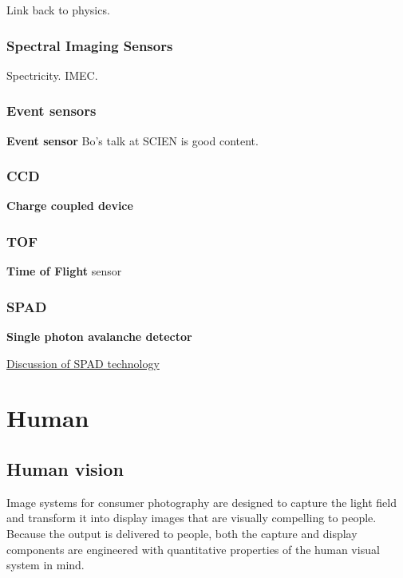 \documentclass[
  letterpaper,
]{book}
\begin{document}
Link back to physics.

\section{Spectral Imaging Sensors}\label{sec-sensor-spectral}

Spectricity. IMEC.

\section{Event sensors}\label{sec-sensor-event}

\textbf{Event sensor} Bo's talk at SCIEN is good content.

\section{CCD}\label{sec-sensor-ccd}

\textbf{Charge coupled device}

\section{TOF}\label{sec-sensor-tof}

\textbf{Time of Flight} sensor

\section{SPAD}\label{sec-sensor-spad}

\textbf{Single photon avalanche detector}

\href{https://g.co/gemini/share/1618a5d47f5a}{Discussion of SPAD
technology}

\part{Human}

\chapter{Human vision}\label{sec-human}

Image systems for consumer photography are designed to capture the light
field and transform it into display images that are visually compelling
to people. Because the output is delivered to people, both the capture
and display components are engineered with quantitative properties of
the human visual system in mind.
\end{document}
